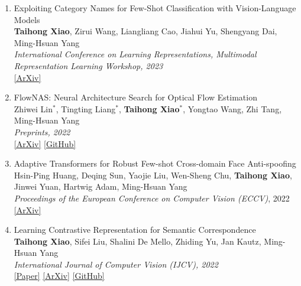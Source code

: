 \documentclass[letterpaper]{article}
\begin{document}
\begin{enumerate}


\item Exploiting Category Names for Few-Shot Classification with Vision-Language Models \\
	{\bf Taihong Xiao}, Zirui Wang, Liangliang Cao, Jiahui Yu, Shengyang Dai, Ming-Hsuan Yang \\
	{\it International Conference on Learning Representations, Multimodal Representation Learning Workshop, 2023} \\
	\href{https://arxiv.org/abs/2211.16594}{[ArXiv]}

	
\item FlowNAS: Neural Architecture Search for Optical Flow Estimation \\
	Zhiwei Lin$^*$, Tingting Liang$^*$, {\bf Taihong Xiao}$^*$, Yongtao Wang, Zhi Tang, Ming-Hsuan Yang \\
	{\it Preprints, 2022} \\
	\href{https://arxiv.org/abs/2207.01271}{[ArXiv]}
	\href{https://github.com/VDIGPKU/FlowNAS}{[GitHub]}
	
\item Adaptive Transformers for Robust Few-shot Cross-domain Face Anti-spoofing \\
	Hsin-Ping Huang, Deqing Sun, Yaojie Liu, Wen-Sheng Chu, {\bf Taihong Xiao}, Jinwei Yuan, Hartwig Adam, Ming-Hsuan Yang \\
	{\it Proceedings of the European Conference on Computer Vision (ECCV)}, 2022 \\
	\href{https://arxiv.org/abs/2203.12175}{[ArXiv]}
	
\item Learning Contrastive Representation for Semantic Correspondence \\
	{\bf Taihong Xiao}, Sifei Liu, Shalini De Mello, Zhiding Yu, Jan Kautz, Ming-Hsuan Yang \\
	{\it International Journal of Computer Vision (IJCV), 2022} \\
	\href{https://link.springer.com/article/10.1007/s11263-022-01602-y}{[Paper]}
	\href{https://arxiv.org/abs/2109.10967}{[ArXiv]}
	\href{https://github.com/NVlabs/contrastive-correspondence}{[GitHub]}


\end{enumerate}
\end{document}
